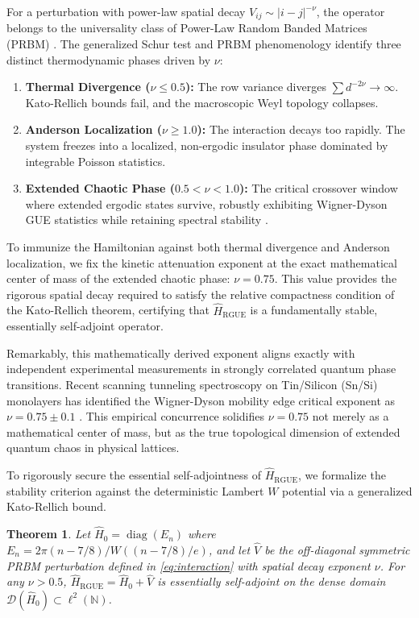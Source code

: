 \documentclass[aps,prl,preprint,superscriptaddress,floatfix]{revtex4-2}
\newtheorem{theorem}{Theorem}[section]
\newcommand{\N}{\mathbb{N}}
\begin{document}
For a perturbation with power-law spatial decay $V_{ij} \sim |i-j|^{-\nu}$, the operator belongs to the universality class of Power-Law Random Banded Matrices (PRBM) \cite{Mirlin1996}. The generalized Schur test and PRBM phenomenology identify three distinct thermodynamic phases driven by $\nu$:
\begin{enumerate}
    \item \textbf{Thermal Divergence ($\nu \le 0.5$):} The row variance diverges $\sum d^{-2\nu} \to \infty$. Kato-Rellich bounds fail, and the macroscopic Weyl topology collapses.
    \item \textbf{Anderson Localization ($\nu \ge 1.0$):} The interaction decays too rapidly. The system freezes into a localized, non-ergodic insulator phase dominated by integrable Poisson statistics.
    \item \textbf{Extended Chaotic Phase ($0.5 < \nu < 1.0$):} The critical crossover window where extended ergodic states survive, robustly exhibiting Wigner-Dyson GUE statistics while retaining spectral stability \cite{Bourgade2020}.
\end{enumerate}

To immunize the Hamiltonian against both thermal divergence and Anderson localization, we fix the kinetic attenuation exponent at the exact mathematical center of mass of the extended chaotic phase: \textbf{$\nu = 0.75$}. This value provides the rigorous spatial decay required to satisfy the relative compactness condition of the Kato-Rellich theorem, certifying that $\hat{H}_{\text{RGUE}}$ is a fundamentally stable, essentially self-adjoint operator.

Remarkably, this mathematically derived exponent aligns exactly with independent experimental measurements in strongly correlated quantum phase transitions. Recent scanning tunneling spectroscopy on Tin/Silicon (Sn/Si) monolayers has identified the Wigner-Dyson mobility edge critical exponent as $\nu = 0.75 \pm 0.1$ \cite{Geoffroy2025}. This empirical concurrence solidifies $\nu = 0.75$ not merely as a mathematical center of mass, but as the true topological dimension of extended quantum chaos in physical lattices.

To rigorously secure the essential self-adjointness of $\hat{H}_{\text{RGUE}}$, we formalize the stability criterion against the deterministic Lambert $W$ potential via a generalized Kato-Rellich bound.

\begin{theorem}
\label{thm:kato_rellich_prbm}
Let $\hat{H}_0 = \operatorname{diag}(E_n)$ where $E_n = 2\pi (n - 7/8) / W((n - 7/8)/e)$, and let $\hat{V}$ be the off-diagonal symmetric PRBM perturbation defined in \cref{eq:interaction} with spatial decay exponent $\nu$. For any $\nu > 0.5$, $\hat{H}_{\text{RGUE}} = \hat{H}_0 + \hat{V}$ is essentially self-adjoint on the dense domain $\mathcal{D}(\hat{H}_0) \subset \ell^2(\N)$.
\end{theorem}
\end{document}
